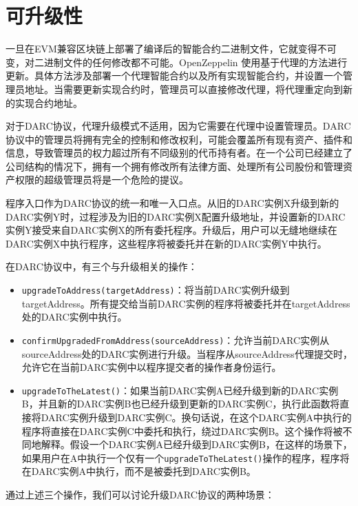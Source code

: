 \documentclass[main.tex]{subfiles}
\begin{document}
\section{可升级性}

一旦在EVM兼容区块链上部署了编译后的智能合约二进制文件，它就变得不可变，对二进制文件的任何修改都不可能。OpenZeppelin \cite{proxy} \cite{ethereumERC1967Proxy} 使用基于代理的方法进行更新。具体方法涉及部署一个代理智能合约以及所有实现智能合约，并设置一个管理员地址。当需要更新实现合约时，管理员可以直接修改代理，将代理重定向到新的实现合约地址。

对于DARC协议，代理升级模式不适用，因为它需要在代理中设置管理员。DARC协议中的管理员将拥有完全的控制和修改权利，可能会覆盖所有现有资产、插件和信息，导致管理员的权力超过所有不同级别的代币持有者。在一个公司已经建立了公司结构的情况下，拥有一个拥有修改所有法律方面、处理所有公司股份和管理资产权限的超级管理员将是一个危险的提议。

程序入口作为DARC协议的统一和唯一入口点。从旧的DARC实例X升级到新的DARC实例Y时，过程涉及为旧的DARC实例X配置升级地址，并设置新的DARC实例Y接受来自DARC实例X的所有委托程序。升级后，用户可以无缝地继续在DARC实例X中执行程序，这些程序将被委托并在新的DARC实例Y中执行。

在DARC协议中，有三个与升级相关的操作：

\begin{itemize}
    \item \texttt{upgradeToAddress(targetAddress)}：将当前DARC实例升级到targetAddress。所有提交给当前DARC实例的程序将被委托并在targetAddress处的DARC实例中执行。
    
    \item \texttt{confirmUpgradedFromAddress(sourceAddress)}：允许当前DARC实例从sourceAddress处的DARC实例进行升级。当程序从sourceAddress代理提交时，允许它在当前DARC实例中以程序提交者的操作者身份运行。

    \item \texttt{upgradeToTheLatest()}：如果当前DARC实例A已经升级到新的DARC实例B，并且新的DARC实例B也已经升级到更新的DARC实例C，执行此函数将直接将DARC实例升级到DARC实例C。换句话说，在这个DARC实例A中执行的程序将直接在DARC实例C中委托和执行，绕过DARC实例B。这个操作将被不同地解释。假设一个DARC实例A已经升级到DARC实例B，在这样的场景下，如果用户在A中执行一个仅有一个\texttt{upgradeToTheLatest()}操作的程序，程序将在DARC实例A中执行，而不是被委托到DARC实例B。
\end{itemize}

通过上述三个操作，我们可以讨论升级DARC协议的两种场景：
\end{document}
